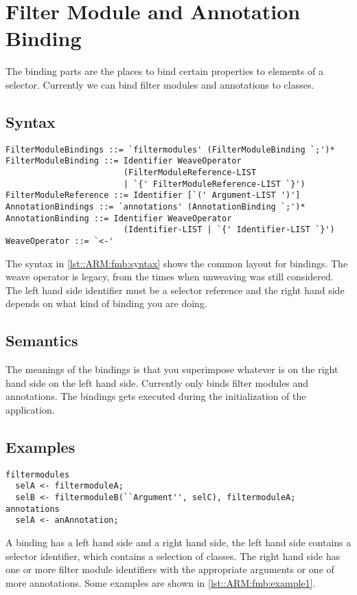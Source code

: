 \chapter{Filter Module and Annotation Binding} \label{ch::arm::fmb}
The binding parts are the places to bind certain properties to elements of a selector. Currently we can bind filter modules
and annotations to classes.

\section*{Syntax}
\begin{lstlisting}[caption = {Bindings syntax}, label = lst::ARM:fmb:syntax,
style = listing, language = ebnf, float = tpb]
FilterModuleBindings ::= `filtermodules' (FilterModuleBinding `;')*
FilterModuleBinding ::= Identifier WeaveOperator 
                        (FilterModuleReference-LIST 
                        | `{' FilterModuleReference-LIST `}')
FilterModuleReference ::= Identifier [`(' Argument-LIST ')']
AnnotationBindings ::= `annotations' (AnnotationBinding `;')*
AnnotationBinding ::= Identifier WeaveOperator 
                        (Identifier-LIST | `{' Identifier-LIST `}')
WeaveOperator ::= `<-'
\end{lstlisting}
The syntax in \autoref{lst::ARM:fmb:syntax} shows the common layout for bindings. The weave operator is legacy, from
the times when unweaving was still considered. The left hand side identifier must be a selector reference and the
right hand side depends on what kind of binding you are doing.

\section*{Semantics}
The meanings of the bindings is that you superimpose whatever is on the right hand side on the left hand side.
Currently \Compose* only binds filter modules and annotations. 
The bindings gets executed during the initialization of the application.

\section*{Examples}
\begin{lstlisting}[caption={Examples of bindings}, label = lst::ARM:fmb:example1,
style=listing, language =ComposeStar, float = tpb]
filtermodules
  selA <- filtermoduleA;
  selB <- filtermoduleB(``Argument'', selC), filtermoduleA;
annotations
  selA <- anAnnotation;
\end{lstlisting}
A binding has a left hand side and a right hand side, the left hand side contains a selector identifier,
which contains a selection of classes. The right hand side has one or more filter module identifiers with the appropriate
arguments or one of more annotations. Some examples are shown in \autoref{lst::ARM:fmb:example1}.


